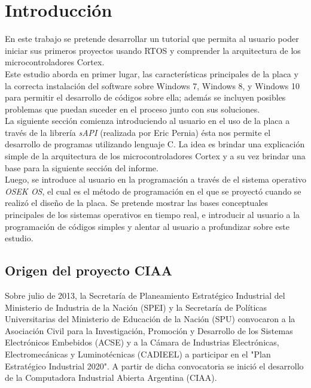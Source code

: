 \documentclass[12pt,letterpaper]{article}
\author{}
\date{}
\begin{document}


\tableofcontents

\section{Introducci\'on}
En este trabajo se pretende desarrollar un tutorial que permita al usuario poder iniciar sus primeros proyectos usando RTOS y comprender la arquitectura de los microcontroladores Cortex.
  \\
  
Este estudio aborda en primer lugar, las características principales de la placa y la correcta instalación del software sobre Windows 7, Windows 8, y Windows 10 para permitir el desarrollo de códigos sobre ella; además se incluyen posibles problemas que puedan suceder en el proceso junto con sus soluciones.
  \\

La siguiente sección comienza introduciendo al usuario en el uso de la placa a través de la librería \textit{sAPI} (realizada por Eric Pernia) ésta nos permite el desarrollo de programas utilizando lenguaje C. La idea es brindar una explicación simple de la arquitectura de los microcontroladores Cortex y a su vez brindar una base para la siguiente sección del informe.
  \\

Luego, se introduce al usuario en la programación a través de el sistema operativo \textit{OSEK OS}, el cual es el método de programación en el que se proyectó cuando se realizó el diseño de la placa. Se pretende mostrar las bases conceptuales principales de los sistemas operativos en tiempo real, e introducir al usuario a la programación de códigos simples y alentar al usuario a profundizar sobre este estudio.

\subsection{Origen del proyecto CIAA}
Sobre julio de 2013, la Secretaría de Planeamiento Estratégico Industrial del Ministerio de Industria de la Nación (SPEI) y la Secretaría de Políticas Universitarias del Ministerio de Educación de la Nación (SPU) convocaron a la Asociación Civil para la Investigación, Promoción y Desarrollo de los Sistemas Electrónicos Embebidos (ACSE) y a la Cámara de Industrias Electrónicas, Electromecánicas y Luminotécnicas (CADIEEL) a participar en el "Plan Estratégico Industrial 2020". A partir de dicha convocatoria se inició el desarrollo de la Computadora Industrial Abierta Argentina (CIAA).
  \\
\end{document}
